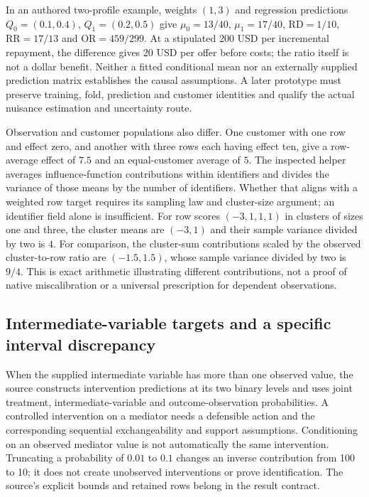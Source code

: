 In an authored two-profile example, weights $(1,3)$ and regression predictions
$Q_0=(0.1,0.4)$, $Q_1=(0.2,0.5)$ give $\mu_0=13/40$, $\mu_1=17/40$,
$\mathrm{RD}=1/10$, $\mathrm{RR}=17/13$ and $\mathrm{OR}=459/299$.
At a stipulated 200 USD per incremental repayment, the difference gives
20 USD per offer before costs; the ratio itself is not a dollar benefit.
Neither a fitted conditional mean nor an externally supplied prediction matrix
establishes the causal assumptions. A later prototype must preserve training,
fold, prediction and customer identities and qualify the actual nuisance
estimation and uncertainty route.
\citep{exec24_tmle_contract}

Observation and customer populations also differ. One customer with one row
and effect zero, and another with three rows each having effect ten, give a
row-average effect of $7.5$ and an equal-customer average of $5$. The inspected
helper averages influence-function contributions within identifiers and divides
the variance of those means by the number of identifiers. Whether that aligns
with a weighted row target requires its sampling law and cluster-size argument;
an identifier field alone is insufficient.
For row scores $(-3,1,1,1)$ in clusters of sizes one and three, the cluster means
are $(-3,1)$ and their sample variance divided by two is $4$. For comparison,
the cluster-sum contributions scaled by the observed cluster-to-row ratio are
$(-1.5,1.5)$, whose sample variance divided by two is $9/4$. This is exact
arithmetic illustrating different contributions, not a proof of native
miscalibration or a universal prescription for dependent observations.
\citep{exec24_tmle_sources,exec24_tmle_contract}

\subsection{Intermediate-variable targets and a specific interval discrepancy}
When the supplied intermediate variable has more than one observed value, the
source constructs intervention predictions at its two binary levels and uses
joint treatment, intermediate-variable and outcome-observation probabilities.
A controlled intervention on a mediator needs a defensible action and the
corresponding sequential exchangeability and support assumptions. Conditioning
on an observed mediator value is not automatically the same intervention.
Truncating a probability of $0.01$ to $0.1$ changes an inverse contribution from
100 to 10; it does not create unobserved interventions or prove identification.
The source's explicit bounds and retained rows belong in the result contract.
\citep{exec24_tmle_sources,exec24_tmle_contract}

